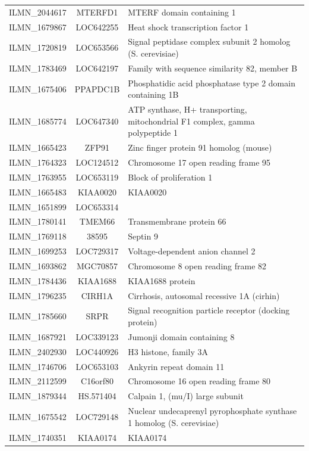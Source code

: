 \begin{xltabular}[!htb]{\textwidth}{|c|c|X|}
  ILMN\_2044617 & MTERFD1 & MTERF domain containing 1 \\ 
  ILMN\_1679867 & LOC642255 & Heat shock transcription factor 1 \\ 
  ILMN\_1720819 & LOC653566 & Signal peptidase complex subunit 2 homolog (S. cerevisiae) \\ 
  ILMN\_1783469 & LOC642197 & Family with sequence similarity 82, member B \\ 
  ILMN\_1675406 & PPAPDC1B & Phosphatidic acid phosphatase type 2 domain containing 1B \\ 
  ILMN\_1685774 & LOC647340 & ATP synthase, H+ transporting, mitochondrial F1 complex, gamma polypeptide 1 \\ 
  ILMN\_1665423 & ZFP91 & Zinc finger protein 91 homolog (mouse) \\ 
  ILMN\_1764323 & LOC124512 & Chromosome 17 open reading frame 95 \\ 
  ILMN\_1763955 & LOC653119 & Block of proliferation 1 \\ 
  ILMN\_1665483 & KIAA0020 & KIAA0020 \\ 
  ILMN\_1651899 & LOC653314 &  \\ 
  ILMN\_1780141 & TMEM66 & Transmembrane protein 66 \\ 
  ILMN\_1769118 & 38595 & Septin 9 \\ 
  ILMN\_1699253 & LOC729317 & Voltage-dependent anion channel 2 \\ 
  ILMN\_1693862 & MGC70857 & Chromosome 8 open reading frame 82 \\ 
  ILMN\_1784436 & KIAA1688 & KIAA1688 protein \\ 
  ILMN\_1796235 & CIRH1A & Cirrhosis, autosomal recessive 1A (cirhin) \\ 
  ILMN\_1785660 & SRPR & Signal recognition particle receptor (docking protein) \\ 
  ILMN\_1687921 & LOC339123 & Jumonji domain containing 8 \\ 
  ILMN\_2402930 & LOC440926 & H3 histone, family 3A \\ 
  ILMN\_1746706 & LOC653103 & Ankyrin repeat domain 11 \\ 
  ILMN\_2112599 & C16orf80 & Chromosome 16 open reading frame 80 \\ 
  ILMN\_1879344 & HS.571404 & Calpain 1, (mu/I) large subunit \\ 
  ILMN\_1675542 & LOC729148 & Nuclear undecaprenyl pyrophosphate synthase 1 homolog (S. cerevisiae) \\ 
  ILMN\_1740351 & KIAA0174 & KIAA0174 \\ 

\end{xltabular}
